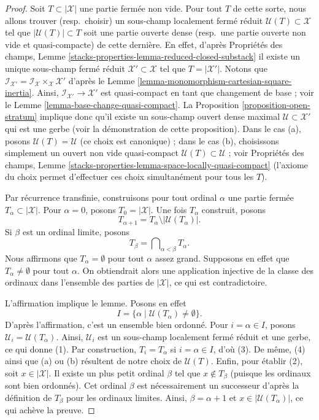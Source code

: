 \begin{proof}
Soit $T \subset |\mathcal{X}|$ une partie fermée non vide. Pour tout $T$ de
cette sorte, nous allons trouver (resp.\ choisir) un sous-champ localement
fermé réduit $\mathcal{U}(T) \subset \mathcal{X}$ tel que
$|\mathcal{U}(T)| \subset T$ soit une partie ouverte dense
(resp.\ une partie ouverte non vide et quasi-compacte) de cette dernière. En effet,
d'après Propriétés des champs, Lemme
\ref{stacks-properties-lemma-reduced-closed-substack}
il existe un unique sous-champ fermé réduit
$\mathcal{X}' \subset \mathcal{X}$ tel que $T = |\mathcal{X}'|$.
Notons que $\mathcal{I}_{\mathcal{X}'} =
\mathcal{I}_\mathcal{X} \times_\mathcal{X} \mathcal{X}'$ d'après le
Lemme \ref{lemma-monomorphism-cartesian-square-inertia}.
Ainsi, $\mathcal{I}_{\mathcal{X}'} \to \mathcal{X}'$ est quasi-compact en
tant que changement de base ; voir le
Lemme \ref{lemma-base-change-quasi-compact}. La
Proposition \ref{proposition-open-stratum} implique donc qu'il existe un
sous-champ ouvert dense maximal $\mathcal{U} \subset \mathcal{X}'$ qui est
une gerbe (voir la démonstration de cette proposition). Dans le cas (a),
posons $\mathcal{U}(T) = \mathcal{U}$ (ce choix est canonique) ; dans le cas
(b), choisissons simplement un ouvert non vide quasi-compact
$\mathcal{U}(T) \subset \mathcal{U}$ ; voir Propriétés des champs, Lemme
\ref{stacks-properties-lemma-space-locally-quasi-compact}
(l'axiome du choix permet d'effectuer ces choix simultanément pour tous les
$T$).

\medskip\noindent
Par récurrence transfinie, construisons pour tout ordinal $\alpha$ une partie
fermée $T_\alpha \subset |\mathcal{X}|$. Pour $\alpha = 0$, posons
$T_0 = |\mathcal{X}|$. Une fois $T_\alpha$ construit, posons
$$
T_{\alpha + 1} = T_\alpha \setminus |\mathcal{U}(T_\alpha)|.
$$
Si $\beta$ est un ordinal limite, posons
$$
T_\beta = \bigcap\nolimits_{\alpha < \beta} T_\alpha.
$$
Nous affirmons que $T_\alpha = \emptyset$ pour tout $\alpha$ assez grand.
Supposons en effet que $T_\alpha \not = \emptyset$ pour tout $\alpha$.
On obtiendrait alors une application injective de la classe des ordinaux dans
l'ensemble des parties de $|\mathcal{X}|$, ce qui est contradictoire.

\medskip\noindent
L'affirmation implique le lemme. Posons en effet
$$
I = \{\alpha \mid \mathcal{U}(T_\alpha) \not = \emptyset \}.
$$
D'après l'affirmation, c'est un ensemble bien ordonné. Pour
$i = \alpha \in I$, posons $\mathcal{U}_i = \mathcal{U}(T_\alpha)$.
Ainsi, $\mathcal{U}_i$ est un sous-champ localement fermé réduit et une
gerbe, ce qui donne (1). Par construction, $T_i = T_\alpha$ si
$i = \alpha \in I$, d'où (3). De même, (4) ainsi que (a) ou (b) résultent
de notre choix de $\mathcal{U}(T)$. Enfin, pour établir (2), soit
$x \in |\mathcal{X}|$. Il existe un plus petit ordinal $\beta$ tel que
$x \not \in T_\beta$ (puisque les ordinaux sont bien ordonnés). Cet ordinal
$\beta$ est nécessairement un successeur d'après la définition de $T_\beta$
pour les ordinaux limites. Ainsi, $\beta = \alpha + 1$ et
$x \in |\mathcal{U}(T_\alpha)|$, ce qui achève la preuve.
\end{proof}

